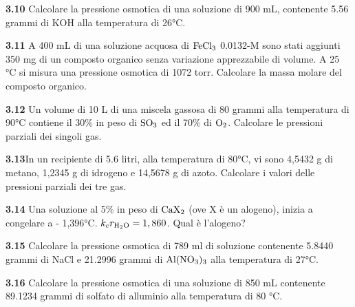 \vspace{0.2cm}\textbf{3.10} Calcolare la pressione osmotica di una soluzione di 900 mL, contenente 5.56 grammi di KOH alla temperatura di 26°C.

\vspace{0.2cm}\textbf{3.11} A 400 mL di una soluzione acquosa di $\rm FeCl_3$ 0.0132-M sono stati aggiunti 350 mg di un composto organico senza variazione apprezzabile di volume. A 25 °C si misura una pressione osmotica di 1072 torr. Calcolare la massa molare del composto organico.

\vspace{0.2cm}\textbf{3.12} Un volume di 10 L di una miscela gassosa di 80 grammi alla temperatura di 90°C contiene il
30\% in peso di $\rm SO_3$ ed il 70\% di $\rm O_2$. Calcolare le pressioni parziali dei singoli gas.

\vspace{0.2cm}\textbf{3.13}In un recipiente di 5.6 litri, alla temperatura di 80°C, vi sono 4,5432 g di metano, 1,2345 g di idrogeno e 14,5678 g di azoto. Calcolare i valori delle pressioni parziali dei tre gas. 

\vspace{0.2cm}\textbf{3.14} Una soluzione al 5\% in peso di $\rm CaX_2$ (ove X è un alogeno), inizia a congelare a - 1,396°C. $k_cr_{\rm H_2O} = 1,860$. Qual è l'alogeno? 

\vspace{0.2cm}\textbf{3.15} Calcolare la pressione osmotica di 789 ml di soluzione contenente 5.8440 grammi di NaCl e  21.2996 grammi di $\rm Al(NO_3)_3$ alla temperatura di 27°C.

\vspace{0.2cm}\textbf{3.16} Calcolare la pressione osmotica di una soluzione di 850 mL contenente 89.1234 grammi di solfato di alluminio alla temperatura di 80 °C.